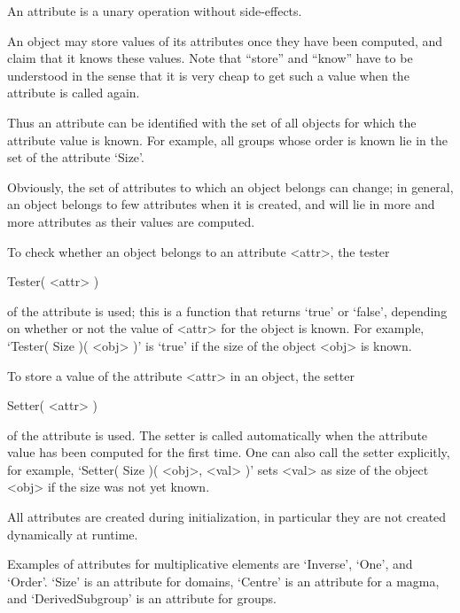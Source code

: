 An attribute is a unary operation without side-effects.

An object may store values of its attributes once they have been
computed, and claim that it knows these values.
Note that ``store'' and ``know'' have to be understood in the sense that 
it is very cheap to get such a value when the attribute is called again.


Thus an attribute can be identified with the set of all objects for which
the attribute value is known.
For example, all groups whose order is known lie in the set of the
attribute `Size'.

Obviously, the set of attributes to which an object belongs can change;
in general, an object belongs to few attributes when it is created,
and will lie in more and more attributes as their values are computed.

To check whether an object belongs to an attribute <attr>,
the tester

\>Tester( <attr> )

of the attribute is used;
this is a function that returns `true' or `false',
depending on whether or not the value of <attr> for the object is known.
For example, `Tester( Size )( <obj> )' is `true' if the size of the object
<obj> is known.


To store a value of the attribute <attr> in an object,
the setter

\>Setter( <attr> )

of the attribute is used.
The setter is called automatically when the attribute value has been
computed for the first time.
One can also call the setter explicitly,
for example, `Setter( Size )( <obj>, <val> )' sets <val> as size of the
object <obj> if the size was not yet known.

All attributes are created during initialization,
in particular they are not created dynamically at runtime.

Examples of attributes for multiplicative elements are `Inverse', `One',
and `Order'.
`Size' is an attribute for domains, `Centre' is an attribute for a magma,
and `DerivedSubgroup' is an attribute for groups.


